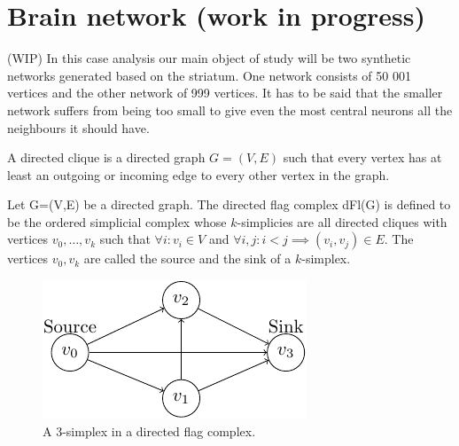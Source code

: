 \clearpage
\section{Brain network (work in progress)}
(WIP)
In this case analysis our main object of study will be two synthetic networks generated based on the striatum.
One network consists of 50 001 vertices and the other network of 999 vertices. It has to be said that the smaller network suffers from being too small to give even the most central neurons all the neighbours it should have.
\begin{definition}
A directed clique is a directed graph $G=(V,E)$ such that every vertex has at least an outgoing or incoming edge to every other vertex in the graph. \end{definition}

\begin{definition}
  Let G=(V,E) be a directed graph. The directed flag complex dFl(G) is defined to be the ordered simplicial complex whose $k$-simplicies are all directed cliques with vertices $v_{0},\dots,v_{k}$ such that $\forall i: v_{i} \in V$
  and $\forall i,j: i < j \implies (v_{i}, v_{j}) \in E$. The vertices $v_{0}, v_{k}$ are called the source and the sink of a $k$-simplex.
\end{definition}

% 
\begin{figure}[ht]
  \centering
  \includegraphics[]{./counts/3simplex.pdf}
  \caption{\label{fig:label} A 3-simplex in a directed flag complex.}
\end{figure}


